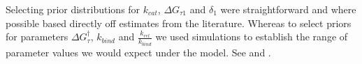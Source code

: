 \documentclass[10pt,letterpaper]{article}
\begin{document}
Selecting prior distributions for $k_{cat}$, $\Delta G_{\tau 1}$ and $\delta_1$ were straightforward and where possible based directly off estimates from the literature.  Whereas to select priors for parameters $\Delta G^\dag_{\tau}$, $k_{bind}$ and $\frac{k_{rel}}{k_{bind}}$ we used simulations to establish the range of parameter values we would expect under the model. See  and . \\




\begin{table}[!htb]
\begin{adjustwidth}{-2.25in}{0in} 
\centering
\caption{
{\bf Prior distributions used during Bayesian inference.}}
\end{adjustwidth}
\end{table}
\end{document}
